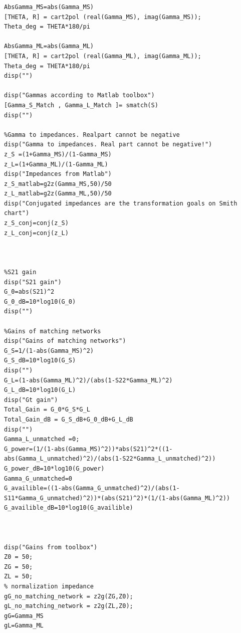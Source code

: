 \documentclass{article}
\begin{document}
\begin{verbatim}
AbsGamma_MS=abs(Gamma_MS)
[THETA, R] = cart2pol (real(Gamma_MS), imag(Gamma_MS));
Theta_deg = THETA*180/pi

AbsGamma_ML=abs(Gamma_ML)
[THETA, R] = cart2pol (real(Gamma_ML), imag(Gamma_ML));
Theta_deg = THETA*180/pi
disp("")

disp("Gammas according to Matlab toolbox")
[Gamma_S_Match , Gamma_L_Match ]= smatch(S)
disp("")

%Gamma to impedances. Realpart cannot be negative
disp("Gamma to impedances. Real part cannot be negative!")
z_S =(1+Gamma_MS)/(1-Gamma_MS)
z_L=(1+Gamma_ML)/(1-Gamma_ML)
disp("Impedances from Matlab")
z_S_matlab=g2z(Gamma_MS,50)/50
z_L_matlab=g2z(Gamma_ML,50)/50
disp("Conjugated impedances are the transformation goals on Smith chart")
z_S_conj=conj(z_S)
z_L_conj=conj(z_L)



%S21 gain
disp("S21 gain")
G_0=abs(S21)^2
G_0_dB=10*log10(G_0)
disp("")

%Gains of matching networks
disp("Gains of matching networks")
G_S=1/(1-abs(Gamma_MS)^2)
G_S_dB=10*log10(G_S)
disp("")
G_L=(1-abs(Gamma_ML)^2)/(abs(1-S22*Gamma_ML)^2)
G_L_dB=10*log10(G_L)
disp("Gt gain")
Total_Gain = G_0*G_S*G_L
Total_Gain_dB = G_S_dB+G_0_dB+G_L_dB
disp("")
Gamma_L_unmatched =0;
G_power=(1/(1-abs(Gamma_MS)^2))*abs(S21)^2*((1-abs(Gamma_L_unmatched)^2)/(abs(1-S22*Gamma_L_unmatched)^2))
G_power_dB=10*log10(G_power)
Gamma_G_unmatched=0
G_availible=((1-abs(Gamma_G_unmatched)^2)/(abs(1-S11*Gamma_G_unmatched)^2))*(abs(S21)^2)*(1/(1-abs(Gamma_ML)^2))
G_availible_dB=10*log10(G_availible)



disp("Gains from toolbox")
Z0 = 50;
ZG = 50;
ZL = 50;
% normalization impedance
gG_no_matching_network = z2g(ZG,Z0);
gL_no_matching_network = z2g(ZL,Z0);
gG=Gamma_MS
gL=Gamma_ML


\end{verbatim}
\end{document}
